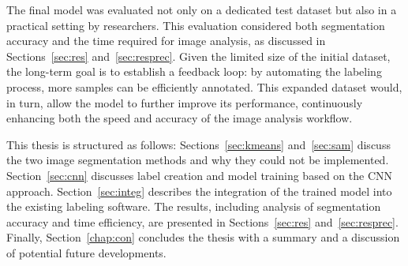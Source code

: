 The final model was evaluated not only on a dedicated test dataset but also in a practical setting by researchers. This evaluation considered both segmentation accuracy and the time required for image analysis, as discussed in Sections~\ref{sec:res} and~\ref{sec:resprec}. Given the limited size of the initial dataset, the long-term goal is to establish a feedback loop: by automating the labeling process, more samples can be efficiently annotated. This expanded dataset would, in turn, allow the model to further improve its performance, continuously enhancing both the speed and accuracy of the image analysis workflow.

This thesis is structured as follows: Sections~\ref{sec:kmeans} and~\ref{sec:sam} discuss the two image segmentation methods and why they could not be implemented. Section~\ref{sec:cnn} discusses label creation and model training based on the CNN approach. Section~\ref{sec:integ} describes the integration of the trained model into the existing labeling software. The results, including analysis of segmentation accuracy and time efficiency, are presented in Sections~\ref{sec:res} and~\ref{sec:resprec}. Finally, Section~\ref{chap:con} concludes the thesis with a summary and a discussion of potential future developments.
